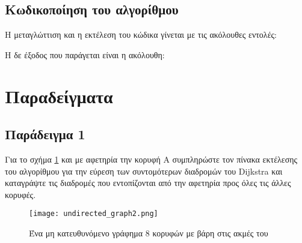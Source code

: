 \subsection{Κωδικοποίηση του αλγορίθμου}






Η μεταγλώττιση και η εκτέλεση του κώδικα γίνεται με τις ακόλουθες εντολές:



Η δε έξοδος που παράγεται είναι η ακόλουθη:




\section{Παραδείγματα}

\subsection{Παράδειγμα 1}
Για το σχήμα \ref{fig:undirected_graph2} και με αφετηρία την κορυφή A συμπληρώστε τον πίνακα εκτέλεσης του αλγορίθμου για την εύρεση των συντομότερων διαδρομών του Dijkstra και καταγράψτε τις διαδρομές που εντοπίζονται από την αφετηρία προς όλες τις άλλες κορυφές.

\begin{figure}[ht]
	\centering
	\texttt{[image: undirected\_graph2.png]}
	\caption{Ένα μη κατευθυνόμενο γράφημα 8 κορυφών με βάρη στις ακμές του}
	\label{fig:undirected_graph2}
\end{figure}

